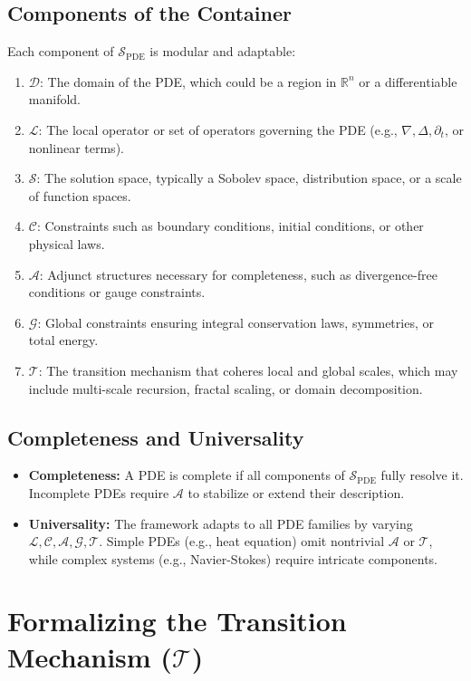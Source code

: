 \documentclass[12pt]{article}
\begin{document}
\subsection{Components of the Container}
Each component of \(\mathcal{S}_{\text{PDE}}\) is modular and adaptable:
\begin{enumerate}
    \item \(\mathcal{D}\): The domain of the PDE, which could be a region in \(\mathbb{R}^n\) or a differentiable manifold.
    \item \(\mathcal{L}\): The local operator or set of operators governing the PDE (e.g., \(\nabla, \Delta, \partial_t\), or nonlinear terms).
    \item \(\mathcal{S}\): The solution space, typically a Sobolev space, distribution space, or a scale of function spaces.
    \item \(\mathcal{C}\): Constraints such as boundary conditions, initial conditions, or other physical laws.
    \item \(\mathcal{A}\): Adjunct structures necessary for completeness, such as divergence-free conditions or gauge constraints.
    \item \(\mathcal{G}\): Global constraints ensuring integral conservation laws, symmetries, or total energy.
    \item \(\mathcal{T}\): The transition mechanism that coheres local and global scales, which may include multi-scale recursion, fractal scaling, or domain decomposition.
\end{enumerate}

\subsection{Completeness and Universality}
\begin{itemize}
    \item \textbf{Completeness:} A PDE is complete if all components of \(\mathcal{S}_{\text{PDE}}\) fully resolve it. Incomplete PDEs require \(\mathcal{A}\) to stabilize or extend their description.
    \item \textbf{Universality:} The framework adapts to all PDE families by varying \(\mathcal{L}, \mathcal{C}, \mathcal{A}, \mathcal{G}, \mathcal{T}\). Simple PDEs (e.g., heat equation) omit nontrivial \(\mathcal{A}\) or \(\mathcal{T}\), while complex systems (e.g., Navier-Stokes) require intricate components.
\end{itemize}

\section{Formalizing the Transition Mechanism (\(\mathcal{T}\))}
\end{document}
